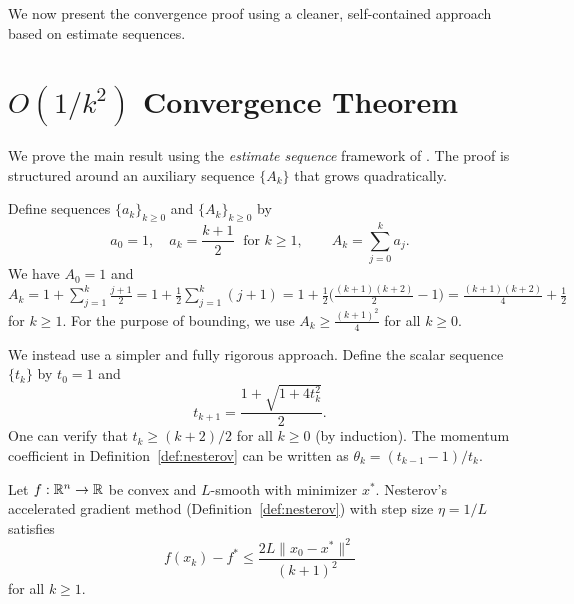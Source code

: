 \documentclass[11pt,a4paper]{article}
\begin{document}
We now present the convergence proof using a cleaner, self-contained
approach based on estimate sequences.


\section{$O(1/k^2)$ Convergence Theorem}\label{sec:convergence}

We prove the main result using the \emph{estimate sequence} framework
of \citet{nesterov2004}. The proof is structured around an auxiliary
sequence $\{A_k\}$ that grows quadratically.

\begin{definition}\label{def:estimate-params}
Define sequences $\{a_k\}_{k \ge 0}$ and $\{A_k\}_{k \ge 0}$ by
\begin{equation}\label{eq:ak-def}
  a_0 = 1, \quad a_k = \frac{k+1}{2} \;\text{ for } k \ge 1,
  \qquad A_k = \sum_{j=0}^{k} a_j.
\end{equation}
We have $A_0 = 1$ and $A_k = 1 + \sum_{j=1}^k \frac{j+1}{2}
= 1 + \frac{1}{2}\sum_{j=1}^k(j+1)
= 1 + \frac{1}{2}\bigl(\frac{(k+1)(k+2)}{2} - 1\bigr)
= \frac{(k+1)(k+2)}{4} + \frac{1}{2}$ for $k \ge 1$.
For the purpose of bounding, we use
$A_k \ge \frac{(k+1)^2}{4}$ for all $k \ge 0$.
\end{definition}

We instead use a simpler and fully rigorous approach. Define the
scalar sequence $\{t_k\}$ by $t_0 = 1$ and
\begin{equation}\label{eq:tk-recurrence}
  t_{k+1} = \frac{1 + \sqrt{1 + 4t_k^2}}{2}.
\end{equation}
One can verify that $t_k \ge (k+2)/2$ for all $k \ge 0$
(by induction). The momentum coefficient in Definition~\ref{def:nesterov}
can be written as $\theta_k = (t_{k-1} - 1)/t_k$.

\begin{theorem}%
\label{thm:nesterov-convergence}
Let $f : \mathbb{R}^n \to \mathbb{R}$ be convex and $L$-smooth with minimizer $x^*$.
Nesterov's accelerated gradient method (Definition~\ref{def:nesterov})
with step size $\eta = 1/L$ satisfies
\begin{equation}\label{eq:nesterov-rate}
  f(x_k) - f^* \le \frac{2L\|x_0 - x^*\|^2}{(k+1)^2}
\end{equation}
for all $k \ge 1$.
\end{theorem}
\end{document}
